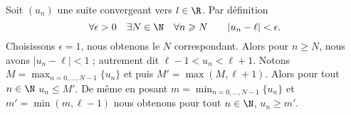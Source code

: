\begin{Soln}{1}
Soit $(u_n)$ une suite convergeant vers $l \in \R$. Par
d\'efinition
$$\forall \epsilon > 0 \quad \exists N \in \N \quad  \forall n\geqslant N \qquad |u_n-\ell| < \epsilon.$$
Choisissons $\epsilon = 1$, nous obtenons le  $N$ correspondant.
Alors pour $n\geqslant N$, nous avons $|u_n-\ell| < 1$ ;
autrement dit $\ell -1 <
u_n < \ell + 1$. Notons $M = \max_{n=0,\ldots,N-1}  \{u_n\}$  et
puis $ M' = \max (M,\ell+1)$. Alors  pour tout $n \in \N$ $u_n
\leq M'$. De m\^eme en posant $m = \min_{n=0,\ldots,N-1} \{u_n\}$ et
$m' = \min(m,\ell -1)$ nous obtenons pour tout $n\in \N$, $u_n
\geq m'$.
\end{Soln}
